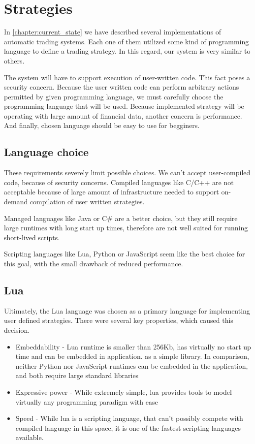 \section{Strategies}
In \autoref{chapter:current_state} we have described several implementations of automatic trading systems. Each one of them
utilized some kind of programming language to define a trading strategy. In this regard, our system is very similar to others.

The system will have to support execution of user-written code. This fact poses a security concern. Because the user
written code can perform arbitrary actions permitted by given programming language, we must carefully choose the programming
language that will be used. Because implemented strategy will be operating with large amount of financial data, another
concern is performance. And finally, chosen language should be easy to use for begginers.

\subsection{Language choice}
These requirements severely limit possible choices. We can't accept user-compiled code, because of security concerns.
Compiled languages like C/C++ are not acceptable because of large amount of infrastructure needed to support
on-demand compilation of user written strategies.

Managed languages like Java or C\# are a better choice, but they still require large runtimes with long start up times, therefore
are not well suited for running short-lived scripts.

Scripting languages like Lua, Python or JavaScript seem like the best choice for this goal, with the small drawback of
reduced performance.

\subsection{Lua}
Ultimately, the Lua language was chosen as a primary language for implementing user defined strategies.  There were several
key properties, which caused this decision.

\begin{itemize}
    \item Embeddability - Lua runtime is smaller than 256Kb, has virtually no start up time and can be embedded in application.
    as a simple library. In comparison, neither Python nor JavaScript runtimes can be embedded in the application, and both
    require large standard libraries
    \item Expressive power - While extremely simple, lua provides tools to model virtually any programming paradigm with ease
    \item Speed - While lua is a scripting language, that can't possibly compete with compiled language in this space,
    it is one of the fastest scripting languages available.
\end{itemize}

